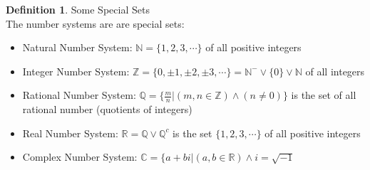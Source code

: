 \documentclass{book}
\theoremstyle{definition}
\newtheorem{definition}{Definition}[section]
\theoremstyle{remark}
\newcommand{\bb}[1]{\mathbb{#1}}
\begin{document}
\begin{definition}
Some Special Sets \\

The number systems are are special sets: \\

    \begin{tcolorbox}
    \begin{itemize}
        \item Natural Number System: $\bb{N} = \{ 1, 2, 3, \cdots \}$ of all positive integers 
    	
    	\item Integer Number System: $\bb{Z} = \{0, \pm 1, \pm 2, \pm 3, \cdots \} = {\bb{N}}^- \vee \{0\} \vee \bb{N}$ of all integers
    	
    	\item Rational Number System: $\mathbb{Q} = \{ \frac{m}{n} | (m,n \in \bb{Z}) \wedge (n \neq 0)\}$ is the set of all rational number (quotients of integers) 
    	
    	\item Real Number System: $\bb{R} = \mathbb{Q} \vee {\mathbb{Q}}^c$ is the set $\{ 1, 2, 3, \cdots \}$ of all positive integers 
    	
    	\item  Complex Number System: $\bb{C} = \{ a+bi | (a,b \in \bb{R})\wedge i=\sqrt{-1}$
    \end{itemize}
    \end{tcolorbox}
\end{definition}
\end{document}
